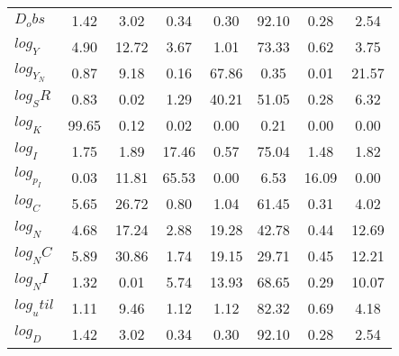 \begin{center}
\begin{longtable}{lccccccc}
$D_obs     $	 & 	        1.42	 & 	        3.02	 & 	        0.34	 & 	        0.30	 & 	       92.10	 & 	        0.28	 & 	        2.54 \\ 
$log_Y     $	 & 	        4.90	 & 	       12.72	 & 	        3.67	 & 	        1.01	 & 	       73.33	 & 	        0.62	 & 	        3.75 \\ 
$log_Y_N   $	 & 	        0.87	 & 	        9.18	 & 	        0.16	 & 	       67.86	 & 	        0.35	 & 	        0.01	 & 	       21.57 \\ 
$log_SR    $	 & 	        0.83	 & 	        0.02	 & 	        1.29	 & 	       40.21	 & 	       51.05	 & 	        0.28	 & 	        6.32 \\ 
$log_K     $	 & 	       99.65	 & 	        0.12	 & 	        0.02	 & 	        0.00	 & 	        0.21	 & 	        0.00	 & 	        0.00 \\ 
$log_I     $	 & 	        1.75	 & 	        1.89	 & 	       17.46	 & 	        0.57	 & 	       75.04	 & 	        1.48	 & 	        1.82 \\ 
$log_p_I   $	 & 	        0.03	 & 	       11.81	 & 	       65.53	 & 	        0.00	 & 	        6.53	 & 	       16.09	 & 	        0.00 \\ 
$log_C     $	 & 	        5.65	 & 	       26.72	 & 	        0.80	 & 	        1.04	 & 	       61.45	 & 	        0.31	 & 	        4.02 \\ 
$log_N     $	 & 	        4.68	 & 	       17.24	 & 	        2.88	 & 	       19.28	 & 	       42.78	 & 	        0.44	 & 	       12.69 \\ 
$log_NC    $	 & 	        5.89	 & 	       30.86	 & 	        1.74	 & 	       19.15	 & 	       29.71	 & 	        0.45	 & 	       12.21 \\ 
$log_NI    $	 & 	        1.32	 & 	        0.01	 & 	        5.74	 & 	       13.93	 & 	       68.65	 & 	        0.29	 & 	       10.07 \\ 
$log_util  $	 & 	        1.11	 & 	        9.46	 & 	        1.12	 & 	        1.12	 & 	       82.32	 & 	        0.69	 & 	        4.18 \\ 
$log_D     $	 & 	        1.42	 & 	        3.02	 & 	        0.34	 & 	        0.30	 & 	       92.10	 & 	        0.28	 & 	        2.54 \\ 
\end{longtable}
 \end{center}
